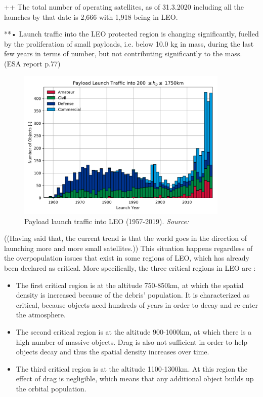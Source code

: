 ++ The total number of operating satellites, as of 31.3.2020 including all the launches by that date is 2,666 with 1,918 being in LEO. \cite{UCS} 

**• Launch traffic into the LEO protected region is changing significantly, fuelled by the proliferation of small
payloads, i.e. below 10.0 kg in mass, during the last few years in terms of number, but not contributing
significantly to the mass. (ESA report p.77)

\begin{figure}
\centering
\includegraphics[width=0.9\textwidth]{Images/launch_traffic_LEO.png}\caption{Payload launch traffic into LEO (1957-2019). \textit{Source: \cite{ESA 2019}}}
\label{launch_traffic} 
\end{figure}

((Having said that, the current trend is that the world goes in the direction of launching more and more small satellites.))
This situation happens regardless of the overpopulation issues that exist in some regions of LEO, which has already been declared as critical. More specifically, the three critical regions in LEO are \cite{Kramer 2002}:
\begin{itemize}
\item The first critical region is at the altitude 750-850km, at which the spatial density is increased because of the debris' population. It is characterized as critical, because objects need hundreds of years in order to decay and re-enter the atmosphere.
\item The second critical region is at the altitude 900-1000km, at which there is a high number of massive objects. Drag is also not sufficient in order to help objects decay and thus the spatial density increases over time.
\item The third critical region is at the altitude 1100-1300km. At this region the effect of drag is negligible, which means that any additional object builds up the orbital population.
\end{itemize}

